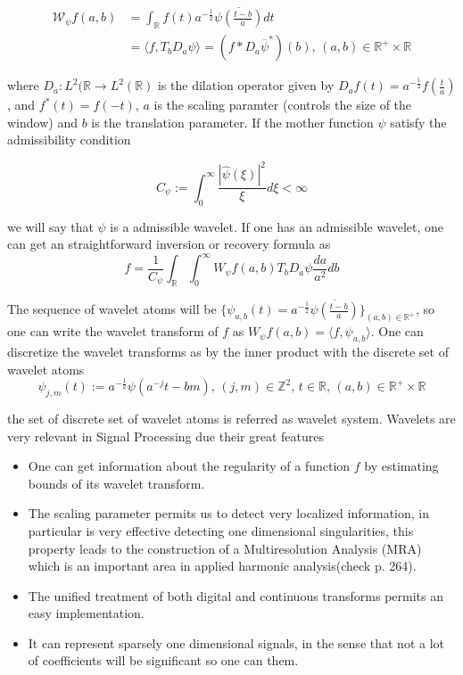 $$
\begin{aligned}
\mathcal{W}_{\psi}f(a,b)&=\int_{\mathbb{R}}f(t)a^{-\frac{1}{2}}\overline{\psi\left(\frac{t-b}{a}\right)}dt\\
&=\langle f, T_bD_a\psi\rangle = (f\ast D_a\overline{\psi}^*)(b)\text{, } (a, b)\in\mathbb{R}^+\times\mathbb{R} 
\end{aligned}
$$

where $D_a:L^2(\mathbb{R}\longrightarrow L^2(\mathbb{R})$ is the dilation operator given by $D_a f(t)=a^{-\frac{1}{2}}f\left(\frac{t}{a}\right)$, and $f^*(t)=f(-t)$, $a$ is the scaling paramter (controls the size of the window) and $b$ is the translation parameter. If the mother function $\psi$ satisfy the admissibility condition 

$$
C_{\psi}:=\int_0^{\infty}\frac{|\hat{\psi}(\xi)|^2}{\xi}d\xi <\infty
$$

we will say that $\psi$ is a admissible wavelet. If one has an admissible wavelet, one can get an straightforward inversion or recovery formula as
$$
f=\frac{1}{C_{\psi}}\int_{\mathbb{R}}\int_0^{\infty} W_{\psi}f(a,b)T_bD_a\psi\frac{da}{a^2}db
$$

\bigskip

The sequence of wavelet atoms will be $\{\psi_{a,b}(t)=a^{-\frac{1}{2}}\overline{\psi\left(\frac{t-b}{a}\right)}\}_{(a,b)\in\mathbb{R}^+}$, so one can write the wavelet transform of $f$ as $W_{\psi}f(a,b)=\langle f,\psi_{a,b}\rangle$. One can discretize the wavelet transforms as by the inner product with the discrete set of wavelet atoms
$$
\psi_{j,m}(t):=a^{-\frac{1}{2}}\psi(a^{-j}t-bm)\text{,  } (j,m)\in\mathbb{Z}^2\text{,  } t\in \mathbb{R}\text{,   }(a,b)\in\mathbb{R}^+\times\mathbb{R}
$$

the set of discrete set of wavelet atoms is referred as wavelet system. Wavelets are very relevant in Signal Processing due their great features 
\begin{itemize}
\item One can get information about the regularity of a function $f$ by estimating bounds of its wavelet transform.
\item The scaling parameter permits us to detect very localized information, in particular is very effective detecting one dimensional singularities, this property leads to the construction of a Multiresolution Analysis (MRA) which is an important area in applied harmonic analysis(check \cite{Mallat} p. 264).
\item The unified treatment of both digital and continuous transforms permits an easy implementation.
\item It can represent sparsely one dimensional signals, in the sense that not a lot of coefficients will be significant so one can  them.
\end{itemize}

